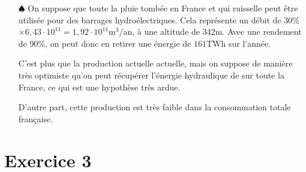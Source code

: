 \documentclass{report}
\begin{document}
\begin{itemize}
	\item[$\spadesuit$] On suppose que toute la pluie tombée en France et qui ruisselle peut être utilisée pour des barrages hydroélectriques. Cela représente un débit de 30\%$\times6,43\cdot10^{11}=1,92\cdot10^{11}$m$^3$/an, à une altitude de 342m. Avec une rendement de 90\%, on peut donc en retirer une énergie de $161$TWh sur l'année. 
	
	C'est plus que la production actuelle actuelle, mais on suppose de manière très optimiste qu'on peut récupérer l'énergie hydraulique de sur toute la France, ce qui est une hypothèse très ardue. 
	
	D'autre part, cette production est très faible dans la consommation totale française.
	
\end{itemize}

\section*{Exercice 3}
\end{document}
